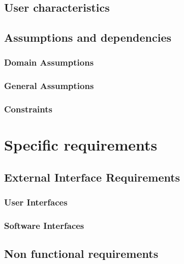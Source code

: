 \documentclass{article}
\begin{document}
\subsection{User characteristics}



\subsection{Assumptions and dependencies}

\subsubsection{Domain Assumptions}


\subsubsection{General Assumptions}


\subsubsection{Constraints}


\clearpage
\section{Specific requirements}

\subsection{External Interface Requirements}

\subsubsection{User Interfaces}


\clearpage
\subsubsection{Software Interfaces}


\subsection{Non functional requirements}

\end{document}
